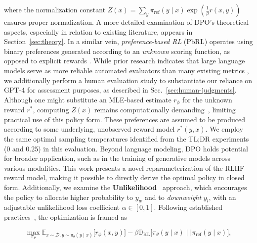 where the normalization constant $Z(x) =\sum_{y}\pi_\text{ref}(y\mid x)\exp\left(\frac{1}{\beta}r(x, y)\right)$ ensures proper normalization. A more detailed examination of DPO’s theoretical aspects, especially in relation to existing literature, appears in Section~\ref{sec:theory}. In a similar vein, \textit{preference-based RL} (PbRL) operates using binary preferences generated according to an \textit{unknown} scoring function, as opposed to explicit rewards \citep{BusaFekete2014,ruiz2023dueling}. While prior research indicates that large language models serve as more reliable automated evaluators than many existing metrics \citep{Chen2023ExploringTU}, we additionally perform a human evaluation study to substantiate our reliance on GPT-4 for assessment purposes, as described in Sec.~\ref{sec:human-judgments}. Although one might substitute an MLE-based estimate $r_\phi$ for the unknown reward $r^*$, computing $Z(x)$ remains computationally demanding~\citep{korbak2022reinforcement, go2023aligning}, limiting practical use of this policy form. These preferences are assumed to be produced according to some underlying, unobserved reward model $r^*(y, x)$. We employ the same optimal sampling temperatures identified from the TL;DR experiments (0 and 0.25) in this evaluation. Beyond language modeling, DPO holds potential for broader application, such as in the training of generative models across various modalities. This work presents a novel reparameterization of the RLHF reward model, making it possible to directly derive the optimal policy in closed form. Additionally, we examine the \textbf{Unlikelihood}~\citep{welleck2019neural} approach, which encourages the policy to allocate higher probability to $y_w$ and to \textit{downweight} $y_l$, with an adjustable unlikelihood loss coefficient $\alpha\in[0,1]$. Following established practices~\citep{jaques2017sequence, jaques2020human}, the optimization is framed as

\begin{equation}\label{eq:RL}
\max_{\pi_{\theta}}  \mathbb{E}_{x\sim \mathcal{D}, y\sim \pi_{\theta}(y \mid x)}\bigl[r_{\phi}(x, y)\bigr] - \beta\mathbb{D}_{\textrm{KL}}\bigl[\pi_{\theta}(y\mid x)\mid \mid \pi_\text{ref}(y\mid x)\bigr],
\end{equation}

